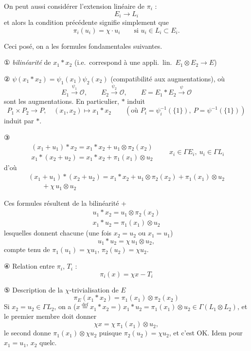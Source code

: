 \documentclass[11pt,a4paper]{article}
\begin{document}
On peut aussi considérer l'extension linéaire de $\pi_i$ :
\[
  E_i \to L_i
\]
et alors la condition précédente signifie simplement que
\[
  \pi_i(u_i) = \chi \cdot u_i \qquad \text{si } u_i \in L_i \subset E_i .
\]

Ceci posé, on a les formules fondamentales suivantes.

① \emph{bilinéarité} de $x_1 * x_2$ (i.e.\ correspond à une appli.\ lin.\ $\boxed{E_1 \otimes E_2 \to E}$)

② $\boxed{\psi(x_1 * x_2) = \psi_1(x_1)\psi_2(x_2)}$ (compatibilité aux augmentations), où
\[
  E_1 \xrightarrow{\psi_1} \mathcal{O}, \qquad
  E_2 \xrightarrow{\psi_2} \mathcal{O}, \qquad
  E = E_1 * E_2 \xrightarrow{\psi} \mathcal{O}
\]
sont les augmentations. En particulier, $*$ induit
\[
  P_1 \times P_2 \to P, \quad (x_1, x_2) \mapsto x_1 * x_2
  \qquad (\text{où } P_i = \psi_i^{-1}(\{1\}),\ P = \psi^{-1}(\{1\}))
\]
induit par $*$.

③
\[
  \boxed{\begin{array}{l}
  (x_1 + u_1) * x_2 = x_1 * x_2 + u_1 \otimes \pi_2(x_2) \\
  x_1 * (x_2 + u_2) = x_1 * x_2 + \pi_1(x_1) \otimes u_2
  \end{array}}
  \qquad x_i \in \Gamma E_i,\ u_i \in \Gamma L_i
\]
d'où
\[
  \boxed{\begin{array}{l}
  (x_1 + u_1) * (x_2 + u_2) = x_1 * x_2 + u_1 \otimes \pi_2(x_2) + \pi_1(x_1) \otimes u_2 \\
  \qquad + \chi\, u_1 \otimes u_2
  \end{array}}
\]

Ces formules résultent de la bilinéarité +
\[
  \boxed{\begin{array}{l}
  u_1 * x_2 = u_1 \otimes \pi_2(x_2) \\
  x_1 * u_2 = \pi_1(x_1) \otimes u_2
  \end{array}}
\]
 lesquelles donnent chacune (une fois $x_2 = u_2$ ou $x_1 = u_1$)
\[
  \boxed{u_1 * u_2 = \chi\, u_1 \otimes u_2},
\]
compte tenu de $\pi_1(u_1) = \chi u_1$, $\pi_2(u_2) = \chi u_2$.

④ Relation entre $\pi_i$, $T_i$ :
\[
  \boxed{\pi_i(x) = \chi x - T_i}
\]

⑤ Description de la $\chi$-trivialisation de $E$
\[
  \boxed{\pi_E(x_1 * x_2) = \pi_1(x_1) \otimes \pi_2(x_2)}
\]
Si $x_2 = u_2 \in \Gamma L_2$, on a ($x \overset{\mathrm{def}}{=} x_1 * x_2 =$) $x_1 * u_2 = \pi_1(x_1) \otimes u_2 \in \Gamma(L_1 \otimes L_2)$, et le premier membre doit donner
\[
  \chi x = \chi\, \pi_1(x_1) \otimes u_2,
\]
le \struck{\ill{}} second donne $\pi_1(x_1) \otimes \chi u_2$ puisque $\pi_2(u_2) = \chi u_2$, et c'est OK. Idem pour $x_1 = u_1$, $x_2$ quelc.
\end{document}
